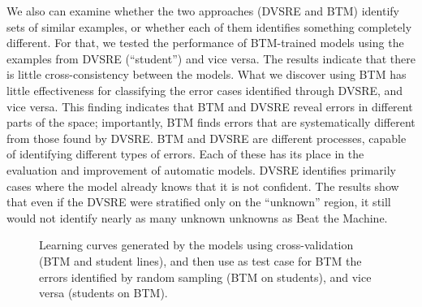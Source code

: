 We also can examine whether the two approaches (DVSRE and BTM) identify sets of similar examples, or whether each of them identifies something completely different. For that, we tested the performance of BTM-trained models using the examples from DVSRE (``student'') and vice versa. The results indicate that there is little cross-consistency between the models. What we discover using BTM has little effectiveness for classifying the error cases identified through DVSRE, and vice versa. This finding indicates that BTM and DVSRE reveal errors in different parts of the space; importantly, BTM finds errors that are systematically different from those found by DVSRE.
BTM and DVSRE are different processes, capable of identifying different types of errors. Each of these has its place in the evaluation and improvement of automatic models. DVSRE identifies primarily cases where the model already knows that it is not confident. 
The results show that even if the DVSRE were stratified only on the ``unknown'' region, it still would not identify nearly as many unknown unknowns as Beat the Machine.



\begin{figure}[t]
\caption{Learning curves generated by the models
using cross-validation (BTM and student lines), and then use as test case for BTM the errors identified by random sampling (BTM on students), and vice versa (students on BTM).}
\label{fig:curves}
\end{figure}


